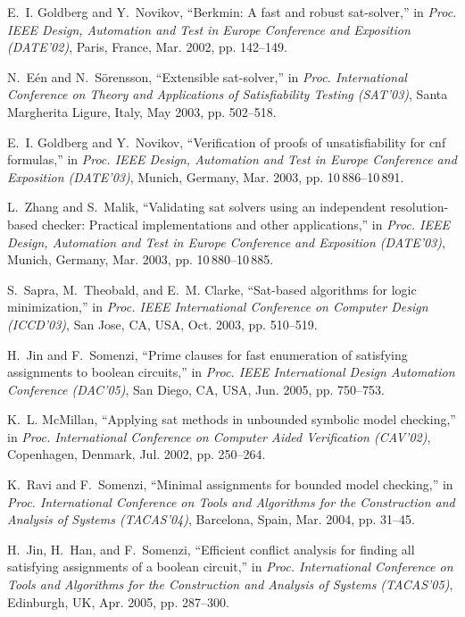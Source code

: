 \documentclass[journal]{IEEEtran}
\begin{document}
\begin{thebibliography}{49}
E.~I. Goldberg and Y.~Novikov, ``Berkmin: A fast and robust sat-solver,'' in
  \emph{Proc. {IEEE} Design, Automation and Test in Europe Conference and
  Exposition ({DATE}'02)}, Paris, France, Mar. 2002, pp. 142--149.

N.~E\'en and N.~S\"orensson, ``Extensible sat-solver,'' in \emph{Proc. International Conference on
  Theory and Applications of Satisfiability Testing ({SAT}'03)}, Santa
  Margherita Ligure, Italy, May 2003, pp. 502--518.

E.~I. Goldberg and Y.~Novikov, ``Verification of proofs of unsatisfiability for
  cnf formulas,'' in \emph{Proc. {IEEE} Design, Automation and Test in Europe
  Conference and Exposition ({DATE}'03)}, Munich, Germany, Mar. 2003, pp.
  10\,886--10\,891.

L.~Zhang and S.~Malik, ``Validating sat solvers using an independent
  resolution-based checker: Practical implementations and other applications,''
  in \emph{Proc. {IEEE} Design, Automation and Test in Europe Conference and
  Exposition ({DATE}'03)}, Munich, Germany, Mar. 2003, pp. 10\,880--10\,885.

S.~Sapra, M.~Theobald, and E.~M. Clarke, ``Sat-based algorithms for logic
  minimization,'' in \emph{Proc. {IEEE} International Conference on Computer
  Design ({ICCD}'03)}, San Jose, CA, USA, Oct. 2003, pp. 510--519.

H.~Jin and F.~Somenzi, ``Prime clauses for fast enumeration of satisfying
  assignments to boolean circuits,'' in \emph{Proc. {IEEE} International Design
  Automation Conference ({DAC}'05)}, San Diego, CA, USA, Jun. 2005, pp.
  750--753.

K.~L. McMillan, ``Applying sat methods in unbounded symbolic model checking,''
  in \emph{Proc. International Conference on Computer Aided Verification
  ({CAV}'02)}, Copenhagen, Denmark, Jul. 2002, pp. 250--264.

K.~Ravi and F.~Somenzi, ``Minimal assignments for bounded model checking,'' in
  \emph{Proc. International Conference on Tools and Algorithms for the
  Construction and Analysis of Systems ({TACAS}'04)}, Barcelona, Spain, Mar.
  2004, pp. 31--45.

H.~Jin, H.~Han, and F.~Somenzi, ``Efficient conflict analysis for finding all
  satisfying assignments of a boolean circuit,'' in \emph{Proc. International
  Conference on Tools and Algorithms for the Construction and Analysis of
  Systems ({TACAS}'05)}, Edinburgh, UK, Apr. 2005, pp. 287--300.


\end{thebibliography}
\end{document}
